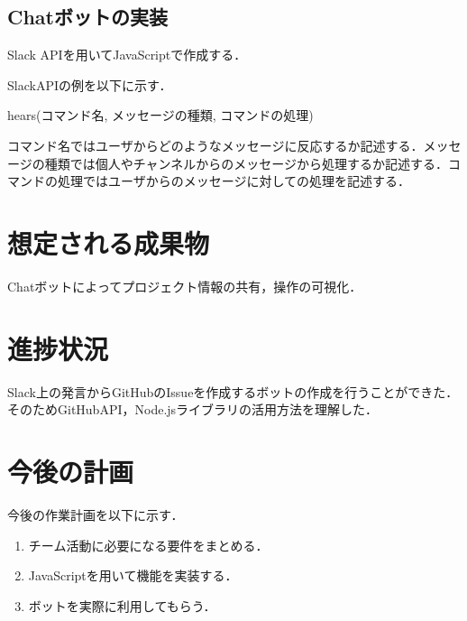 \documentclass[uplatex,twocolumn,dvipdfmx]{jsarticle}
\begin{document}
\subsection{Chatボットの実装}
Slack APIを用いてJavaScriptで作成する．

SlackAPIの例を以下に示す．

hears(コマンド名, メッセージの種類, コマンドの処理)

コマンド名ではユーザからどのようなメッセージに反応するか記述する．メッセージの種類では個人やチャンネルからのメッセージから処理するか記述する．コマンドの処理ではユーザからのメッセージに対しての処理を記述する．





\section{想定される成果物}
Chatボットによってプロジェクト情報の共有，操作の可視化．

\section{進捗状況}
Slack上の発言からGitHubのIssueを作成するボットの作成を行うことができた．そのためGitHubAPI，Node.jsライブラリの活用方法を理解した．




\section{今後の計画}
今後の作業計画を以下に示す．
\begin{enumerate}
\item チーム活動に必要になる要件をまとめる．
\item JavaScriptを用いて機能を実装する．
\item ボットを実際に利用してもらう．
\end{enumerate}




\end{document}
